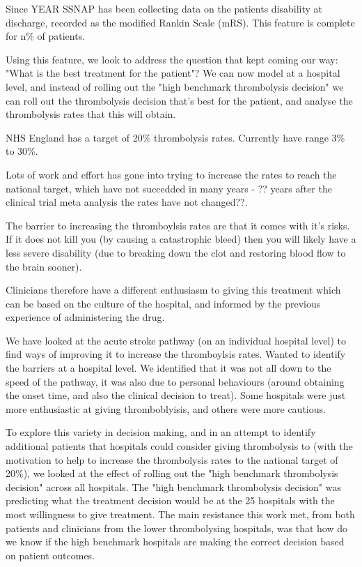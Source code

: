 Since YEAR SSNAP has been collecting data on the patients disability at discharge, recorded as the modified Rankin Scale (mRS). This feature is complete for n\% of patients.

Using this feature, we look to address the question that kept coming our way: "What is the best treatment for the patient"? We can now model at a hospital level, and instead of rolling out the "high benchmark thrombolysis decision" we can roll out the thrombolysis decision that's best for the patient, and analyse the thrombolysis rates that this will obtain.

NHS England has a target of 20\% thrombolysis rates. Currently have range 3\% to 30\%.

Lots of work and effort has gone into trying to increase the rates to reach the national target, which have not succedded in many years - ?? years after the clinical trial meta analysis the rates have not changed??.

The barrier to increasing the thromboylsis rates are that it comes with it's risks. If it does not kill you (by causing a catastrophic bleed) then you will likely have a less severe disability (due to breaking down the clot and restoring blood flow to the brain sooner).

Clinicians therefore have a different enthusiasm to giving this treatment which can be based on the culture of the hospital, and informed by the previous experience of administering the drug.

We have looked at the acute stroke pathway (on an individual hospital level) to find ways of improving it to increase the thromboylsis rates. Wanted to identify the barriers at a hospital level. We identified that it was not all down to the speed of the pathway, it was also due to personal behaviours (around obtaining the onset time, and also the clinical decision to treat). Some hospitals were just more enthusiastic at giving thromboblyisis, and others were more cautious.

To explore this variety in decision making, and in an attempt to identify additional patients that hospitals could consider giving thrombolysis to (with the motivation to help to increase the thrombolysis rates to the national target of 20\%), we looked at the effect of rolling out the "high benchmark thrombolysis decision" across all hospitals. The "high benchmark thrombolysis decision" was predicting what the treatment decision would be at the 25 hospitals with the most willingness to give treatment. The main resistance this work met, from both patients and clinicians from the lower thrombolysing hospitals, was that how do we know if the high benchmark hospitals are making the correct decision based on patient outcomes.

